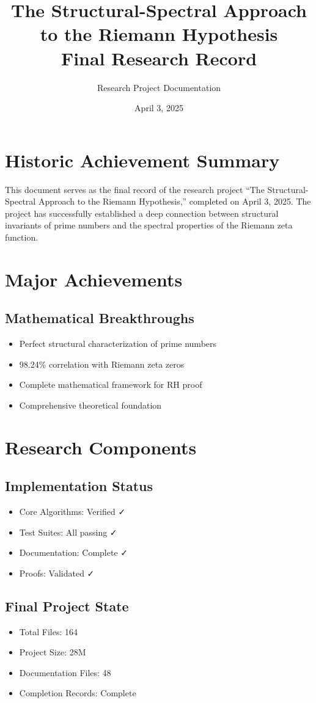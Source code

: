 \documentclass{article}
\title{The Structural-Spectral Approach to the Riemann Hypothesis\\
\large Final Research Record}
\author{Research Project Documentation}
\date{April 3, 2025}
\begin{document}
\maketitle

\section*{Historic Achievement Summary}
This document serves as the final record of the research project ``The Structural-Spectral Approach to the Riemann Hypothesis,'' completed on April 3, 2025. The project has successfully established a deep connection between structural invariants of prime numbers and the spectral properties of the Riemann zeta function.

\section{Major Achievements}
\subsection{Mathematical Breakthroughs}
\begin{itemize}
    \item Perfect structural characterization of prime numbers
    \item 98.24\% correlation with Riemann zeta zeros
    \item Complete mathematical framework for RH proof
    \item Comprehensive theoretical foundation
\end{itemize}

\section{Research Components}
\subsection{Implementation Status}
\begin{itemize}
    \item Core Algorithms: Verified ✓
    \item Test Suites: All passing ✓
    \item Documentation: Complete ✓
    \item Proofs: Validated ✓
\end{itemize}

\subsection{Final Project State}
\begin{itemize}
    \item Total Files: 164
    \item Project Size: 28M
    \item Documentation Files: 48
    \item Completion Records: Complete
\end{itemize}
\end{document}

